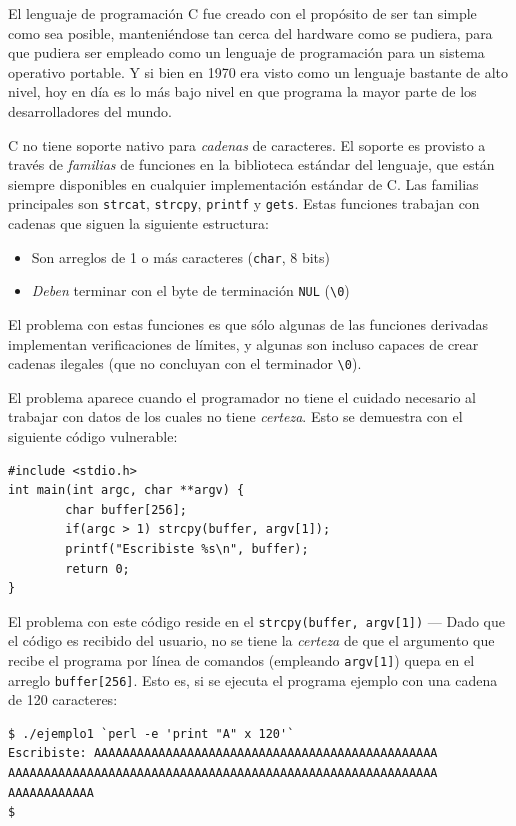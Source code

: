 \documentclass[11pt,fleqn]{book} %
\begin{document}
El lenguaje de programación C fue creado con el propósito de ser tan
simple como sea posible, manteniéndose tan cerca del hardware como se
pudiera, para que pudiera ser empleado 
como un lenguaje de programación para un sistema operativo portable. 
Y si bien en 1970 era visto como un lenguaje bastante de alto nivel, 
hoy en día es lo más bajo nivel en que programa la mayor parte de los desarrolladores
del mundo.

C no tiene soporte nativo para \emph{cadenas} de caracteres. El soporte es
provisto a través de \emph{familias} de funciones en la biblioteca estándar
del lenguaje, que están siempre disponibles en cualquier
implementación estándar de C. Las familias principales son \texttt{strcat},
\texttt{strcpy}, \texttt{printf} y \texttt{gets}. Estas funciones trabajan con cadenas que
siguen la siguiente estructura:

\begin{itemize}
\item Son arreglos de 1 o más caracteres (\texttt{char}, 8 bits)
\item \emph{Deben} terminar con el byte de terminación \texttt{NUL} (\texttt{\textbackslash{}0})
\end{itemize}

El problema con estas funciones es que sólo algunas de las funciones
derivadas implementan verificaciones de límites, y algunas son incluso
capaces de crear cadenas ilegales (que no concluyan con el terminador
\texttt{\textbackslash{}0}).

El problema aparece cuando el programador no tiene el cuidado
necesario al trabajar con datos de los cuales no tiene \emph{certeza}. Esto
se demuestra con el siguiente código vulnerable:


\begin{verbatim}
#include <stdio.h>
int main(int argc, char **argv) {
        char buffer[256];
        if(argc > 1) strcpy(buffer, argv[1]);
        printf("Escribiste %s\n", buffer);
        return 0;
}
\end{verbatim}

El problema con este código reside en el \texttt{strcpy(buffer, argv[1])} —
Dado que el código es recibido del usuario, no se tiene la \emph{certeza}
de que el argumento que recibe el programa por línea de comandos
 (empleando \texttt{argv[1]}) quepa en el arreglo \texttt{buffer[256]}. Esto es, 
si se ejecuta el programa ejemplo con una cadena de 120 caracteres:


\begin{verbatim}
$ ./ejemplo1 `perl -e 'print "A" x 120'`
Escribiste: AAAAAAAAAAAAAAAAAAAAAAAAAAAAAAAAAAAAAAAAAAAAAAAA
AAAAAAAAAAAAAAAAAAAAAAAAAAAAAAAAAAAAAAAAAAAAAAAAAAAAAAAAAAAA
AAAAAAAAAAAA
$
\end{verbatim}
\end{document}
